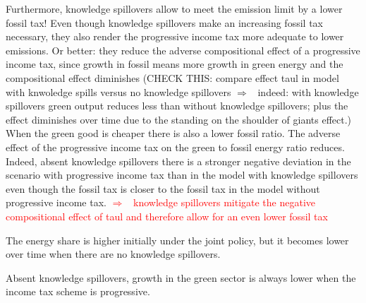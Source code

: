 \documentclass[12pt]{article}
\newcommand{\ar}{$\Rightarrow$ \ }
\newcommand{\tr}[1]{\textcolor{red}{#1}}
\begin{document}
Furthermore, knowledge spillovers allow to meet the emission limit by a lower fossil tax! Even though knowledge spillovers make an increasing fossil tax necessary, they also render the progressive income tax more adequate to lower emissions. Or better: they reduce the adverse compositional effect of a progressive income tax, since growth in fossil means more  growth in green energy and the compositional effect diminishes (CHECK THIS: compare effect taul in model with knwoledge spills versus no knowledge spillovers \ar indeed: with knowledge spillovers green output reduces less than without knowledge spillovers; plus the effect diminishes over time due to the standing on the shoulder of giants effect.) When the green good is cheaper there is also a lower fossil ratio. The adverse effect of the progressive income tax on the green to fossil energy ratio reduces. Indeed, absent knowledge spillovers there is a stronger negative deviation in the scenario with progressive income tax than in the model with knowledge spillovers even though the fossil tax is closer to the fossil tax in the model without progressive income tax. 
\tr{ \ar knowledge spillovers mitigate the negative compositional effect of taul and therefore allow for an even lower fossil tax}

The energy share is higher initially under the joint policy, but it becomes lower over time when there are no knowledge spillovers. 

Absent knowledge spillovers, growth in the green sector is always lower when the income tax scheme is progressive. 
\end{document}
